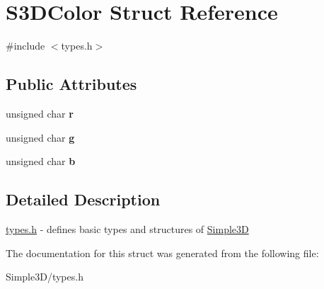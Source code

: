 \hypertarget{struct_s3_d_color}{
\section{S3DColor Struct Reference}
\label{struct_s3_d_color}
}


{\ttfamily \#include $<$types.h$>$}

\subsection*{Public Attributes}
\begin{DoxyCompactItemize}
\item 
\hypertarget{struct_s3_d_color_a4a7329c346d7745fd46b81a5d1cac393}{
unsigned char {\bfseries r}}
\label{struct_s3_d_color_a4a7329c346d7745fd46b81a5d1cac393}

\item 
\hypertarget{struct_s3_d_color_a6f926b101765a5b848dfb5acdce1f1a4}{
unsigned char {\bfseries g}}
\label{struct_s3_d_color_a6f926b101765a5b848dfb5acdce1f1a4}

\item 
\hypertarget{struct_s3_d_color_af03f6858e55796ca988a17b15c2284b3}{
unsigned char {\bfseries b}}
\label{struct_s3_d_color_af03f6858e55796ca988a17b15c2284b3}

\end{DoxyCompactItemize}


\subsection{Detailed Description}
\hyperlink{types_8h_source}{types.h} -\/ defines basic types and structures of \hyperlink{class_simple3_d}{Simple3D} 

The documentation for this struct was generated from the following file:\begin{DoxyCompactItemize}
\item 
Simple3D/types.h\end{DoxyCompactItemize}
